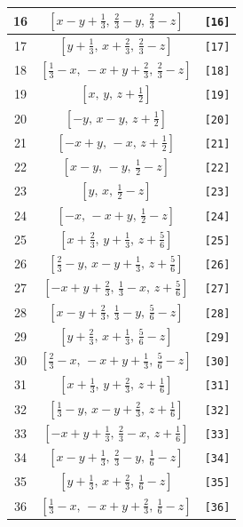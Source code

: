\documentclass[fleqn,8pt]{jsarticle}
\begin{document}
\begin{longtable}{ccc}
16 & $\left[ x - y + \frac{1}{3},\, \frac{2}{3} - y,\, \frac{2}{3} - z \right]$ & {\tt [16]} \\ \hline
17 & $\left[ y + \frac{1}{3},\, x + \frac{2}{3},\, \frac{2}{3} - z \right]$ & {\tt [17]} \\ \hline
18 & $\left[ \frac{1}{3} - x,\, - x + y + \frac{2}{3},\, \frac{2}{3} - z \right]$ & {\tt [18]} \\ \hline
19 & $\left[ x,\, y,\, z + \frac{1}{2} \right]$ & {\tt [19]} \\ \hline
20 & $\left[ - y,\, x - y,\, z + \frac{1}{2} \right]$ & {\tt [20]} \\ \hline
21 & $\left[ - x + y,\, - x,\, z + \frac{1}{2} \right]$ & {\tt [21]} \\ \hline
22 & $\left[ x - y,\, - y,\, \frac{1}{2} - z \right]$ & {\tt [22]} \\ \hline
23 & $\left[ y,\, x,\, \frac{1}{2} - z \right]$ & {\tt [23]} \\ \hline
24 & $\left[ - x,\, - x + y,\, \frac{1}{2} - z \right]$ & {\tt [24]} \\ \hline
25 & $\left[ x + \frac{2}{3},\, y + \frac{1}{3},\, z + \frac{5}{6} \right]$ & {\tt [25]} \\ \hline
26 & $\left[ \frac{2}{3} - y,\, x - y + \frac{1}{3},\, z + \frac{5}{6} \right]$ & {\tt [26]} \\ \hline
27 & $\left[ - x + y + \frac{2}{3},\, \frac{1}{3} - x,\, z + \frac{5}{6} \right]$ & {\tt [27]} \\ \hline
28 & $\left[ x - y + \frac{2}{3},\, \frac{1}{3} - y,\, \frac{5}{6} - z \right]$ & {\tt [28]} \\ \hline
29 & $\left[ y + \frac{2}{3},\, x + \frac{1}{3},\, \frac{5}{6} - z \right]$ & {\tt [29]} \\ \hline
30 & $\left[ \frac{2}{3} - x,\, - x + y + \frac{1}{3},\, \frac{5}{6} - z \right]$ & {\tt [30]} \\ \hline
31 & $\left[ x + \frac{1}{3},\, y + \frac{2}{3},\, z + \frac{1}{6} \right]$ & {\tt [31]} \\ \hline
32 & $\left[ \frac{1}{3} - y,\, x - y + \frac{2}{3},\, z + \frac{1}{6} \right]$ & {\tt [32]} \\ \hline
33 & $\left[ - x + y + \frac{1}{3},\, \frac{2}{3} - x,\, z + \frac{1}{6} \right]$ & {\tt [33]} \\ \hline
34 & $\left[ x - y + \frac{1}{3},\, \frac{2}{3} - y,\, \frac{1}{6} - z \right]$ & {\tt [34]} \\ \hline
35 & $\left[ y + \frac{1}{3},\, x + \frac{2}{3},\, \frac{1}{6} - z \right]$ & {\tt [35]} \\ \hline
36 & $\left[ \frac{1}{3} - x,\, - x + y + \frac{2}{3},\, \frac{1}{6} - z \right]$ & {\tt [36]} \\
\end{longtable}
\end{document}
